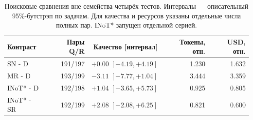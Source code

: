 \begin{table}[htbp]\centering\small
\caption{Поисковые сравнения вне семейства четырёх тестов. Интервалы --- описательный 95\%-бутстрэп по задачам. Для качества и ресурсов указаны отдельные числа полных пар. INoT* запущен отдельной серией.}\label{tab:heldout-exploratory}
\begin{tabular}{lrrrr}\toprule
Контраст & Пары Q/R & Качество [интервал] & Токены, отн. & USD, отн.\\
\midrule
SN - D & 191/197 & $+0.00\;[-4.19,+4.19]$ & 1.230 & 1.632\\
MR - D & 193/199 & $-3.11\;[-7.77,+1.04]$ & 3.444 & 3.359\\
INoT* - D & 192/198 & $+1.04\;[-3.65,+5.73]$ & 0.925 & 0.805\\
INoT* - SR & 192/199 & $+2.08\;[-2.08,+6.25]$ & 0.821 & 0.600\\
\bottomrule\end{tabular}\end{table}

